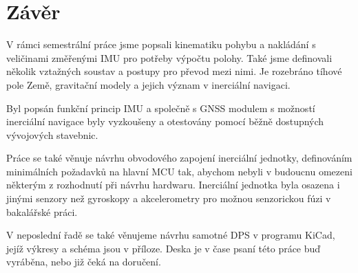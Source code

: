 \chapter*{Závěr}
{}
V rámci semestrální práce jsme popsali kinematiku pohybu a nakládání s veličinami změřenými IMU pro potřeby výpočtu polohy. Také jsme definovali několik vztažných soustav a postupy pro převod mezi nimi. Je rozebráno tíhové pole Země, gravitační modely a jejich význam v inerciální navigaci.

Byl popsán funkční princip IMU a společně s GNSS modulem s možností inerciální navigace byly vyzkoušeny a otestovány pomocí běžně dostupných vývojových stavebnic.

Práce se také věnuje návrhu obvodového zapojení inerciální jednotky, definováním minimálních požadavků na hlavní MCU tak, abychom nebyli v budoucnu omezeni některým z rozhodnutí při návrhu hardwaru. Inerciální jednotka byla osazena i jinými senzory než gyroskopy a akcelerometry pro možnou senzorickou fúzi v bakalářské práci.

V neposlední řadě se také věnujeme návrhu samotné DPS v programu KiCad, jejíž výkresy a schéma jsou v příloze. Deska je v čase psaní této práce buď vyráběna, nebo již čeká na doručení.
